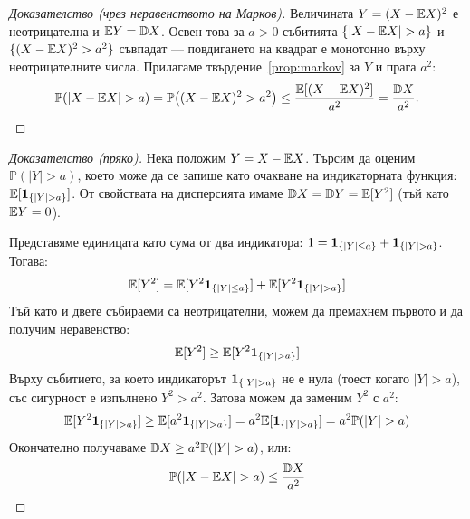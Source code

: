 \begin{lecfigure}
\end{lecfigure}

\begin{proof}[Доказателство (чрез неравенството на Марков)]
Величината $Y = (X - \mathbb{E} X)^2$ е неотрицателна и $\mathbb{E} Y = \mathbb{D} X$. Освен това за $a > 0$
събитията $\{|X - \mathbb{E} X| > a\}$ и $\{(X - \mathbb{E} X)^2 > a^2\}$ съвпадат — повдигането на
квадрат е монотонно върху неотрицателните числа. Прилагаме твърдение~\ref{prop:markov}
за $Y$ и прага $a^2$:
\[
\mathbb{P}(|X - \mathbb{E} X| > a) = \mathbb{P}\big((X - \mathbb{E} X)^2 > a^2\big)
\le \frac{\mathbb{E}[(X - \mathbb{E} X)^2]}{a^2} = \frac{\mathbb{D} X}{a^2} .
\]
\end{proof}

\begin{proof}[Доказателство (пряко)]
Нека положим $Y = X - \mathbb{E} X$. Търсим да оценим $\mathbb{P}(|Y| > a)$, което може да се запише като очакване на индикаторната функция: $\mathbb{E}[\mathbf{1}_{\{|Y| > a\}}]$.
От свойствата на дисперсията имаме $\mathbb{D} X = \mathbb{D} Y = \mathbb{E}[Y^2]$ (тъй като $\mathbb{E} Y = 0$).

Представяме единицата като сума от два индикатора: $1 = \mathbf{1}_{\{|Y| \le a\}} + \mathbf{1}_{\{|Y| > a\}}$. Тогава:
\[
\mathbb{E}[Y^2] = \mathbb{E}[Y^2 \mathbf{1}_{\{|Y| \le a\}}] + \mathbb{E}[Y^2 \mathbf{1}_{\{|Y| > a\}}]
\]
Тъй като и двете събираеми са неотрицателни, можем да премахнем първото и да получим неравенство:
\[
\mathbb{E}[Y^2] \ge \mathbb{E}[Y^2 \mathbf{1}_{\{|Y| > a\}}]
\]
Върху събитието, за което индикаторът $\mathbf{1}_{\{|Y| > a\}}$ не е нула (тоест когато $|Y| > a$), със сигурност е изпълнено $Y^2 > a^2$. Затова можем да заменим $Y^2$ с $a^2$:
\[
\mathbb{E}[Y^2 \mathbf{1}_{\{|Y| > a\}}] \ge \mathbb{E}[a^2 \mathbf{1}_{\{|Y| > a\}}] = a^2 \mathbb{E}[\mathbf{1}_{\{|Y| > a\}}] = a^2 \mathbb{P}(|Y| > a)
\]
Окончателно получаваме $\mathbb{D} X \ge a^2 \mathbb{P}(|Y| > a)$, или:
\[
\mathbb{P}(|X - \mathbb{E} X| > a) \le \frac{\mathbb{D} X}{a^2}
\]
\end{proof}

